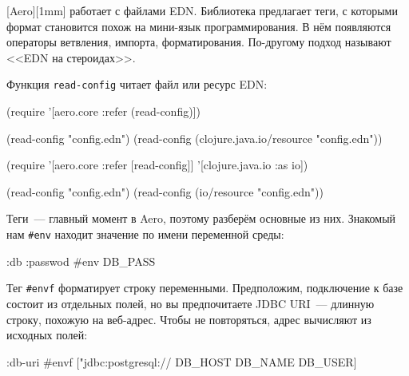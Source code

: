 
[Aero][1mm] работает с файлами
EDN. Библиотека предлагает теги, с которыми формат становится похож на мини-язык
программирования. В нём появляются операторы ветвления, импорта,
форматирования. По-другому подход называют <<EDN на стероидах>>.


Функция \verb|read-config| читает файл или ресурс EDN:

\ifx\DEVICETYPE\MOBILE

\begin{english}
  \begin{clojure}
(require
  '[aero.core :refer (read-config)])

(read-config "config.edn")
(read-config
  (clojure.java.io/resource
    "config.edn"))
  \end{clojure}
\end{english}

\else

\begin{english}
  \begin{clojure}
(require '[aero.core :refer [read-config]]
         '[clojure.java.io :as io])

(read-config "config.edn")
(read-config (io/resource "config.edn"))
  \end{clojure}
\end{english}

\fi


Теги~--- главный момент в Aero, поэтому разберём основные из них. Знакомый нам
\verb|#env| находит значение по имени переменной среды:

\begin{english}
  \begin{clojure}
{:db {:passwod #env DB_PASS}}
  \end{clojure}
\end{english}

Тег \verb|#envf| форматирует строку переменными. Предположим, подключение к базе
состоит из отдельных полей, но вы предпочитаете JDBC URI~--- длинную строку,
похожую на веб-адрес. Чтобы не повторяться, адрес вычисляют из исходных полей:

\ifx\DEVICETYPE\MOBILE

\begin{english}
  \begin{clojure}
{:db-uri
 #envf ["jdbc:postgresql://%
        DB_HOST DB_NAME DB_USER]}
  \end{clojure}
\end{english}

